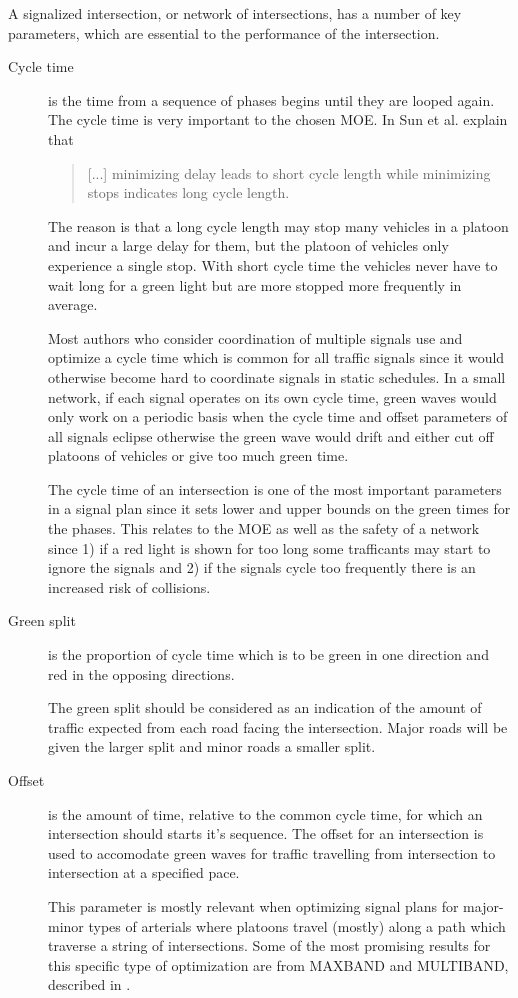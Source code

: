 \label{theproblem}

A signalized intersection, or network of intersections, has a number of key parameters, which are essential to the performance of the intersection.

\begin{description}
\item[Cycle time] is the time from a sequence of phases begins until they are looped again. The cycle time is very important to the chosen MOE. In \cite{41} Sun et al. explain that 

\begin{quote}[...] minimizing delay leads to short cycle length while minimizing stops indicates long cycle length.
\end{quote}

The reason is that a long cycle length may stop many vehicles in a platoon and incur a large delay for them, but the platoon of vehicles only experience a single stop. With short cycle time the vehicles never have to wait long for a green light but are more stopped more frequently in average.

Most authors who consider coordination of multiple signals use and optimize a cycle time which is common for all traffic signals since it would otherwise become hard to coordinate signals in static schedules. In a small network, if each signal operates on its own cycle time, green waves would only work on a periodic basis when the cycle time and offset parameters of all signals eclipse otherwise the green wave would drift and either cut off platoons of vehicles or give too much green time.

The cycle time of an intersection is one of the most important parameters in a signal plan since it sets  lower and upper bounds on the green times for the phases. This relates to the MOE as well as the safety of a network since 1) if a red light is shown for too long some trafficants may start to ignore the signals and 2) if the signals cycle too frequently there is an increased risk of collisions.

\item[Green split]  is the proportion of cycle time which is to be green in one direction and red in the opposing directions. 

The green split should be considered as an indication of the amount of traffic expected from each road facing the intersection. Major roads will be given the larger split and minor roads a smaller split.

\item[Offset] is the amount of time, relative to the common cycle time, for which an intersection should starts it's sequence. The offset for an intersection is used to accomodate green waves for traffic travelling from intersection to intersection at a specified pace.

This parameter is mostly relevant when optimizing signal plans for major-minor types of arterials where platoons travel (mostly) along a path which traverse a string of intersections. Some of the most promising results for this specific type of optimization are from MAXBAND and MULTIBAND, described in \cite{37}.

\end{description}

